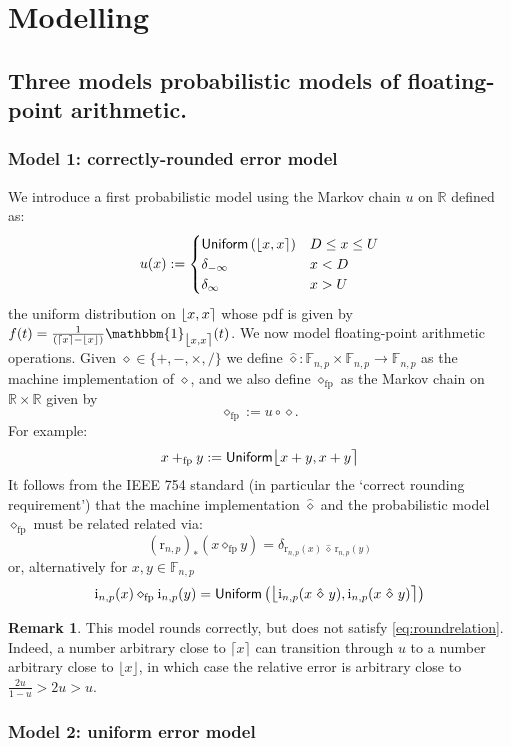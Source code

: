 \documentclass[10pt,a4paper]{article}
\theoremstyle{plain}
\theoremstyle{definition}
\newtheorem{remark}[theorem]{Remark}
\newcommand{\F}[1][n,p]{\mathbb{F}_{#1}}
\newcommand{\R}{\mathbb{R}}
\newcommand{\Rep}[1][n,p]{\mathrm{i}_{#1}}
\newcommand{\Round}[1][n,p]{\mathrm{r}_{#1}}
\newcommand{\one}{\mathbbm{1}}
\newcommand{\Unif}{\mathsf{Uniform}}
\newcommand{\ceil}[1]{\lceil #1 \rceil}
\newcommand{\floor}[1]{\lfloor #1 \rfloor}
\newcommand{\fintvl}[1][x]{\mathlarger{\lfloor}#1,#1\mathlarger{\rceil}}
\newcommand{\fp}{_{\mathrm{fp}}}
\begin{document}
\section{Modelling}



\subsection{Three models probabilistic models of floating-point arithmetic.}


\subsubsection{Model 1: correctly-rounded error model}
We introduce a first probabilistic model using the Markov chain $u$ on $\R$ defined as:
\[
u(x):=\begin{cases}
\Unif\left(\fintvl\right)& D\leq x\leq U\\
\delta_{-\infty}& x< D\\
\delta_{\infty} & x>U\end{cases}
\]
the uniform distribution on $\fintvl$ whose pdf is given by $f(t)=\frac{1}{(\ceil{x}-\floor{x})}\one_{\fintvl}(t)$. We now model floating-point arithmetic operations. Given $\diamond\in \{+,-,\times,/\}$ we define $\widehat{\diamond}:\F\times \F\to \F$ as the machine implementation of $\diamond$, and we also define $\diamond\fp$ as the Markov chain on $\R\times \R$ given by
\[
\diamond\fp:=u\circ\diamond.
\]
For example:
\[
x+\fp y:=\Unif\fintvl[x+y]
\]
It follows from the IEEE 754 standard (in particular the `correct rounding requirement') that the machine implementation $\hat{\diamond}$ and the probabilistic model $\diamond\fp$ must be related related via:
\[
(\Round)_\ast(x\diamond\fp y)=\delta_{\Round(x)~\widehat{\diamond}~\Round(y)}
\]
or, alternatively for $x,y\in\F$
\[
\Rep(x)\diamond\fp \Rep(y)=\Unif\left(\fintvl[\Rep(x~\hat{\diamond}~y)]\right)
\]

\begin{remark}
This model rounds correctly, but does not satisfy \eqref{eq:roundrelation}. Indeed, a number arbitrary close to $\ceil{x}$ can transition through $u$ to a number arbitrary close to $\floor{x}$, in which case the relative error is arbitrary close to $\frac{2u}{1-u}>2u>u$.
\end{remark}

\subsubsection{Model 2: uniform error model}
\end{document}
